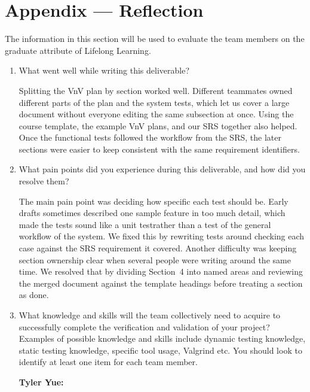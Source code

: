 \documentclass[12pt, titlepage]{article}
\begin{document}
\newpage{}

\section{Appendix --- Reflection}


The information in this section will be used to evaluate the team members on the
graduate attribute of Lifelong Learning.



\begin{enumerate}
  \item What went well while writing this deliverable?

  Splitting the VnV plan by section worked well. Different teammates owned
  different parts of the plan and the system tests, which let us cover a large
  document without everyone editing the same subsection at once. Using the
  course template, the example VnV plans, and our SRS together also helped.
  Once the functional tests followed the workflow from the SRS, the
  later sections were easier to keep consistent with the same requirement identifiers.

  \item What pain points did you experience during this deliverable, and how
    did you resolve them?

  The main pain point was deciding how specific each test should be. Early
  drafts sometimes described one sample feature in too much detail, which made
  the tests sound like a unit testrather than a test of the general
  workflow of the system. We fixed this by rewriting tests around checking each case against the SRS requirement it
   covered. Another difficulty was keeping section ownership clear
  when several people were writing around the same time. We resolved that by
  dividing Section~4 into named areas and reviewing the merged document
  against the template headings before treating a section as done.

  \item What knowledge and skills will the team collectively need to acquire to
  successfully complete the verification and validation of your project?
  Examples of possible knowledge and skills include dynamic testing knowledge,
  static testing knowledge, specific tool usage, Valgrind etc.  You should look to
  identify at least one item for each team member.

  \textbf{Tyler Yue:}


\end{enumerate}
\end{document}
